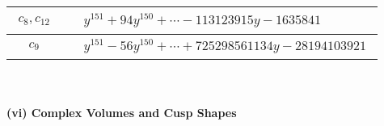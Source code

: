 \documentclass[1p]{elsarticle_modified}
\theoremstyle{definition}
\begin{document}
\begin{tabular}{m{50pt}|m{274pt}}
\hline $$\begin{aligned}c_{8},c_{12}\end{aligned}$$&$\begin{aligned}
&y^{151}+94 y^{150}+\cdots-113123915 y-1635841
\end{aligned}$\\
\hline $$\begin{aligned}c_{9}\end{aligned}$$&$\begin{aligned}
&y^{151}-56 y^{150}+\cdots+725298561134 y-28194103921
\end{aligned}$\\
\hline
\end{tabular}\\~\\
\newpage\flushleft \textbf{(vi) Complex Volumes and Cusp Shapes}
\end{document}
